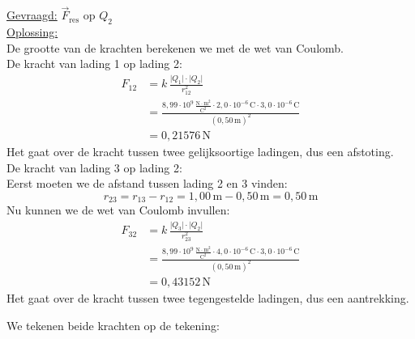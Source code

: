 \documentclass{ximera}
\begin{document}
\begin{exercise}
\begin{solution}
        \underline{Gevraagd:} $\vec{F}_{\text{res}}$ op \(Q_{2}\) \\

        \underline{Oplossing:}\\
        De grootte van de krachten berekenen we met de wet van Coulomb.\\
        De kracht van lading 1 op lading 2:
        \begin{align*}
            F_{12}&=k\,\frac{\lvert Q_{1}\rvert\cdot \lvert Q_{2}\rvert}{r_{12}^{2}}\\
            &=\frac{8{,}99 \cdot 10^9 \, \mathrm{\frac{N \cdot m^2}{C^2}} \cdot 2{,}0 \cdot 10^{-6} \, \mathrm{C} \cdot 3{,}0 \cdot 10^{-6} \, \mathrm{C}}{(0{,}50 \, \mathrm{m})^{2}}\\
            &= 0{,}21576 \, \mathrm{N}
        \end{align*}
        Het gaat over de kracht tussen twee gelijksoortige ladingen, dus een afstoting.\\
        De kracht van lading 3 op lading 2:\\
        Eerst moeten we de afstand tussen lading 2 en 3 vinden:
        \begin{equation*}
            r_{23}=r_{13}-r_{12}= 1{,}00 \, \mathrm{m} - 0{,}50 \, \mathrm{m} = 0{,}50 \, \mathrm{m}
        \end{equation*}
        Nu kunnen we de wet van Coulomb invullen:
        \begin{align*}
            F_{32}&=k\,\frac{\lvert Q_{3}\rvert\cdot \lvert Q_{2}\rvert}{r_{23}^{2}}\\
            &=\frac{8{,}99 \cdot 10^9 \, \mathrm{\frac{N \cdot m^2}{C^2}} \cdot 4{,}0 \cdot 10^{-6} \, \mathrm{C} \cdot 3{,}0 \cdot 10^{-6} \, \mathrm{C}}{(0{,}50 \, \mathrm{m})^{2}}\\
            &= 0{,}43152 \, \mathrm{N}
        \end{align*}
        Het gaat over de kracht tussen twee tegengestelde ladingen, dus een aantrekking.

        We tekenen beide krachten op de tekening:\nl
        \begin{center}
\end{center}
\end{solution}
\end{exercise}
\end{document}

